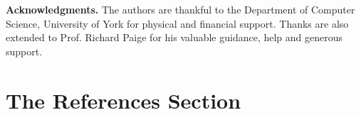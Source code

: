\documentclass[runningheads,a4paper]{llncs}
\begin{document}





















\noindent\textbf{Acknowledgments.} The authors are thankful to the Department of Computer Science, University of York for physical and financial support. %
Thanks are also extended to Prof. Richard Paige for his valuable guidance, help and generous support.




\section{The References Section}
\renewcommand\refname{}
\vspace*{-0.7cm}


\end{document}

